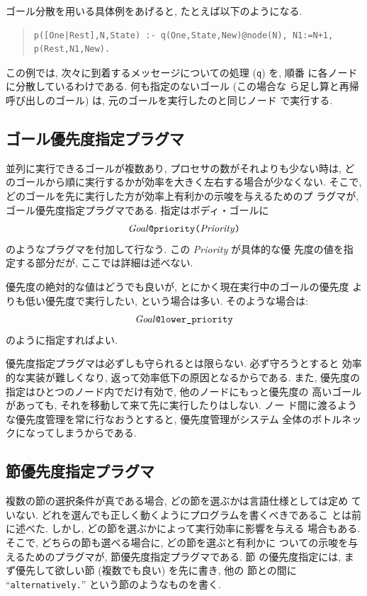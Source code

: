 \documentclass[a4,titlepage]{jsreport}
\newenvironment{program}{\begin{quote}}{\end{quote}}
\begin{document}
ゴール分散を用いる具体例をあげると, たとえば以下のようになる.
\begin{program}
\begin{verbatim}
p([One|Rest],N,State) :- q(One,State,New)@node(N), N1:=N+1, p(Rest,N1,New).
\end{verbatim}
\end{program}
この例では, 次々に到着するメッセージについての処理 ({\tt q}) を, 順番
に各ノードに分散しているわけである.  何も指定のないゴール (この場合な
ら足し算と再帰呼び出しのゴール) は, 元のゴールを実行したのと同じノード
で実行する.

\subsection{ゴール優先度指定プラグマ}
並列に実行できるゴールが複数あり, プロセサの数がそれよりも少ない時は, 
どのゴールから順に実行するかが効率を大きく左右する場合が少なくない.
そこで, どのゴールを先に実行した方が効率上有利かの示唆を与えるためのプ
ラグマが, ゴール優先度指定プラグマである.  指定はボディ・ゴールに
\[\hbox{{\it Goal\/}{\tt @priority(}{\it Priority\/}{\tt )}}\]
のようなプラグマを付加して行なう.  この {\it Priority\/} が具体的な優
先度の値を指定する部分だが, ここでは詳細は述べない.

優先度の絶対的な値はどうでも良いが, とにかく現在実行中のゴールの優先度
よりも低い優先度で実行したい, という場合は多い.  そのような場合は:
\[\hbox{{\it Goal\/}{\verb|@lower_priority|}}\]
のように指定すればよい.

優先度指定プラグマは必ずしも守られるとは限らない.  必ず守ろうとすると
効率的な実装が難しくなり, 返って効率低下の原因となるからである.  また, 
優先度の指定はひとつのノード内でだけ有効で, 他のノードにもっと優先度の
高いゴールがあっても, それを移動して来て先に実行したりはしない.  ノー
ド間に渡るような優先度管理を常に行なおうとすると, 優先度管理がシステム
全体のボトルネックになってしまうからである.

\subsection{節優先度指定プラグマ}
複数の節の選択条件が真である場合, どの節を選ぶかは言語仕様としては定め
ていない.  どれを選んでも正しく動くようにプログラムを書くべきであるこ
とは前に述べた.  しかし, どの節を選ぶかによって実行効率に影響を与える
場合もある.  そこで, どちらの節も選べる場合に, どの節を選ぶと有利かに
ついての示唆を与えるためのプラグマが, 節優先度指定プラグマである.  節
の優先度指定には, まず優先して欲しい節 (複数でも良い) を先に書き, 他の
節との間に ``{\tt alternatively.}'' という節のようなものを書く.
\end{document}
